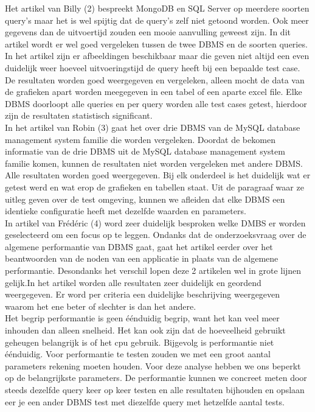\documentclass[fleqn,10pt]{artikeltin}
\begin{document}
Het artikel van Billy (2) bespreekt MongoDB en SQL Server op meerdere soorten query’s maar het is wel spijtig dat de query’s zelf niet getoond worden. Ook meer gegevens dan de uitvoertijd zouden een mooie aanvulling geweest zijn. In dit artikel wordt er wel goed vergeleken tussen de twee DBMS en de soorten queries. In het artikel zijn er afbeeldingen beschikbaar maar die geven niet altijd een even duidelijk weer hoeveel uitvoeringstijd de query heeft bij een bepaalde test case. De resultaten worden goed weergegeven en vergeleken, alleen mocht de data van de grafieken apart worden meegegeven in een tabel of een aparte excel file. Elke DBMS doorloopt alle queries en per query worden alle test cases getest, hierdoor zijn de resultaten statistisch significant.\\

In het artikel van Robin (3) gaat het over drie DBMS van de MySQL database management system familie die worden vergeleken. Doordat de bekomen informatie van de drie DBMS uit de MySQL database management system familie komen, kunnen de resultaten niet worden vergeleken met andere DBMS. Alle resultaten worden goed weergegeven. Bij elk onderdeel is het duidelijk wat er getest werd en wat erop de grafieken en tabellen staat. Uit de paragraaf waar ze uitleg geven over de test omgeving, kunnen we afleiden dat elke DBMS een identieke configuratie heeft met dezelfde waarden en parameters.\\

In artikel van Frédéric (4) word zeer duidelijk besproken welke DMBS er worden geselecteerd om een focus op te leggen. Ondanks dat de onderzoeksvraag over de algemene performantie van DBMS gaat, gaat het artikel eerder over het beantwoorden van de noden van een applicatie in plaats van de algemene performantie. Desondanks het verschil lopen deze 2 artikelen wel in grote lijnen gelijk.In het artikel worden alle resultaten zeer duidelijk en geordend weergegeven. Er word per criteria een duidelijke beschrijving weergegeven waarom het ene beter of slechter is dan het andere.\\

Het begrip performantie is geen éénduidig begrip, want het kan veel meer inhouden dan alleen snelheid. Het kan ook zijn dat de hoeveelheid gebruikt geheugen belangrijk is of het cpu gebruik. Bijgevolg is performantie niet éénduidig. Voor performantie te testen zouden we met een groot aantal parameters rekening moeten houden. Voor deze analyse hebben we ons beperkt op de belangrijkste parameters. De performantie kunnen we concreet meten door steeds dezelfde query keer op keer testen en alle resultaten bijhouden en opslaan eer je een ander DBMS test met diezelfde query met hetzelfde aantal tests.
\end{document}
